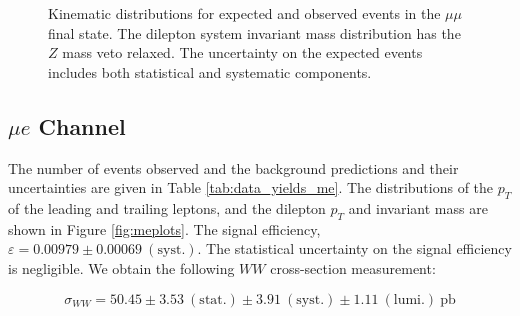 \begin{figure}[!hbtp]
\begin{center}
\caption{Kinematic distributions for expected and observed events in the $\mu\mu$ final state.
The dilepton system invariant mass distribution has the $Z$ mass veto relaxed.
The uncertainty on the expected events includes both statistical and systematic components.}
\label{fig:mmplots}
\end{center}
\end{figure}

%
%
%
\clearpage
\subsection{$\mu e$ Channel}

The number of events observed and the background predictions and their uncertainties are
given in Table \ref{tab:data_yields_me}.
The distributions of the $p_{T}$ of the leading and trailing leptons, and the dilepton $p_{T}$
and invariant mass are shown in Figure \ref{fig:meplots}.
The signal efficiency,  $\varepsilon = 0.00979 \pm 0.00069~\mathrm{(syst.)}$.
The statistical uncertainty on the signal efficiency is negligible.
We obtain the following $WW$ cross-section measurement:

\begin{equation*}
\sigma_{WW}  = 50.45 \pm 3.53~\mathrm{(stat.)} \pm 3.91~\mathrm{(syst.)} \pm 1.11~\mathrm{(lumi.)~pb} 
\end{equation*}

